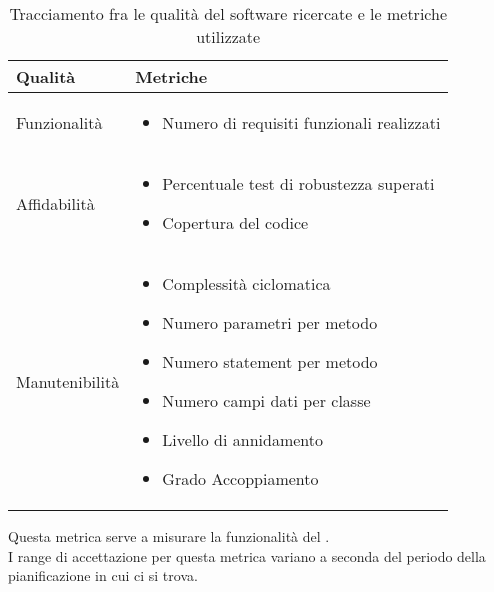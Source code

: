			\begin{table}[H]
			\begin{center}
			\begin{tabular}{ | m{4cm} | m{8cm} | } 
			\hline
			\textbf{Qualità} & \textbf{Metriche} \\ \hline

                        Funzionalità & \begin{itemize} \item Numero di requisiti funzionali realizzati \end{itemize} \\ \hline
                        Affidabilità & \begin{itemize}
                                 \item Percentuale test di robustezza superati
                                 \item Copertura del codice
                                \end{itemize} \\ \hline
                        Manutenibilità     & \begin{itemize}
                                    \item Complessità ciclomatica
                                    \item Numero parametri per metodo
                                    \item Numero statement per metodo
                                    \item Numero campi dati per classe
                                    \item Livello di annidamento
                                    \item Grado Accoppiamento
                                  \end{itemize}\\ \hline 
			\end{tabular}
			\end{center}
			\caption{Tracciamento fra le qualità del software ricercate e le metriche utilizzate}
			\end{table}
					Questa metrica serve a misurare la funzionalità del . \\
					I range di accettazione per questa metrica variano a seconda del periodo della pianificazione in cui ci si trova.
